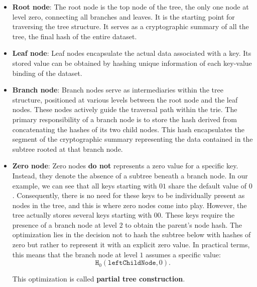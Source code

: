\begin{itemize}

\item \textbf{Root node}: The root node is the top node of the tree, the only one node at level zero, connecting all branches and leaves. It is the starting point for traversing the tree structure. It serves as a cryptographic summary of all the tree, the final hash of the entire dataset.

\item \textbf{Leaf node}: Leaf nodes encapsulate the actual data associated with a key. Its stored value can be obtained by hashing unique information of each key-value binding of the dataset.


\item \textbf{Branch node}: Branch nodes serve as intermediaries within the tree structure, positioned at various levels between the root node and the leaf nodes. These nodes actively guide the traversal path within the trie. The primary responsibility of a branch node is to store the hash derived from concatenating the hashes of its two child nodes. This hash encapsulates the segment of the cryptographic summary representing the data contained in the subtree rooted at that branch node.

\item \textbf{Zero node}: Zero nodes \textbf{do not} represents a zero value for a specific key. Instead, they denote the absence of a subtree beneath a branch node. In our example, we can see that all keys starting with $01$ share the default value of $0$. Consequently, there is no need for these keys to be individually present as nodes in the tree, and this is where zero nodes come into play. However, the tree actually stores several keys starting with $00$. These keys require the presence of a branch node at level $2$ to obtain the parent's node hash. The optimization lies in the decision not to hash the subtree below with hashes of zero but rather to represent it with an explicit zero value. In practical terms, this means that the branch node at level $1$ assumes a specific value:
\[
\texttt{H}_0(\texttt{leftChildNode}, 0).
\]

This optimization is called \textbf{partial tree construction}.

\end{itemize}

